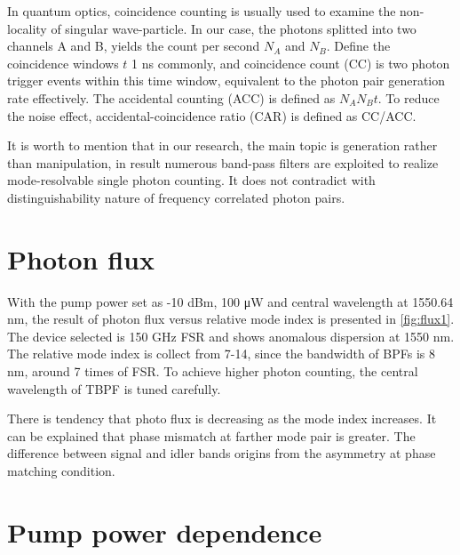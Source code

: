 In quantum optics, coincidence counting is usually used to examine the non-locality of singular wave-particle. In our case, the photons splitted into two channels A and B, yields the count per second $N_A$ and $ N_B $. Define the coincidence windows $t$ 1 ns commonly, and coincidence count (CC) is two photon trigger events within this time window, equivalent to the photon pair generation rate effectively. The accidental counting (ACC) is defined as $ N_A N_B t $. To reduce the noise effect, accidental-coincidence ratio (CAR) is defined as CC/ACC.


It is worth to mention that in our research, the main topic is generation rather than manipulation, in result numerous band-pass filters are exploited to realize mode-resolvable single photon counting. It does not contradict with distinguishability nature of frequency correlated photon pairs.


\section{Photon flux}

With the pump power set as -10 dBm, 100 \si{\micro\watt} and central wavelength at 1550.64 nm, the result of photon flux versus relative mode index is presented in \autoref{fig:flux1}. The device selected is 150 GHz FSR and shows anomalous dispersion at 1550 nm. The relative mode index is collect from 7-14, since the bandwidth of BPFs is 8 nm, around 7 times of FSR. To achieve higher photon counting, the central wavelength of TBPF is tuned carefully.

There is tendency that photo flux is decreasing as the mode index increases. It can be explained that phase mismatch at farther mode pair is greater. The difference between signal and idler bands origins from the asymmetry at phase matching condition. 

\begin{figure}
	\centering
	
	\label{fig:flux1}
\end{figure}




\section{Pump power dependence}

